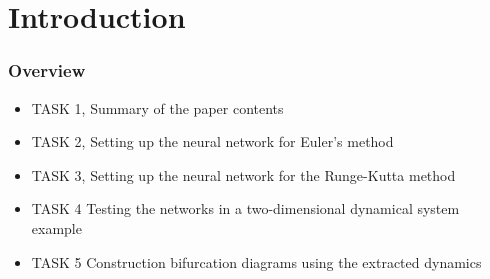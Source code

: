 \section{Introduction}

\begin{frame}
	\frametitle{Overview}
	\begin{itemize}
		\item TASK 1, Summary of the paper contents
		\item TASK 2, Setting up the neural network for Euler's method
		\item TASK 3, Setting up the neural network for the Runge-Kutta method
		\item TASK 4 Testing the networks in a two-dimensional dynamical system example
		\item TASK 5 Construction bifurcation diagrams using the extracted dynamics
	\end{itemize}
\end{frame}
